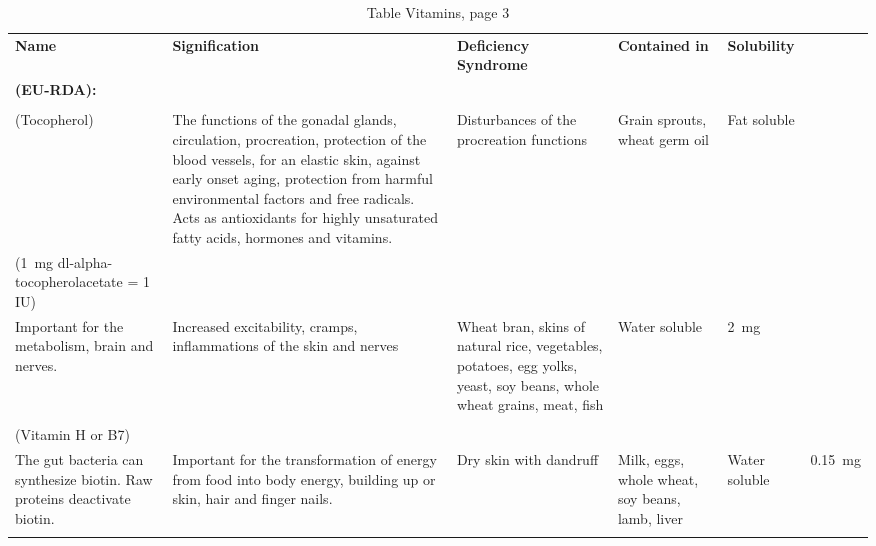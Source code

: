 \documentclass[../main.tex]{subfiles}
\begin{document}
\begin{sidewaystable}[p!]
  \caption{Table Vitamins, page 3}
  \centering
  \begin{tabularx}{\textwidth}{p{3cm}p{4cm}p{5.5cm}p{2.5cm}p{1.5cm}p{2.7cm}}
    \toprule
    \textbf{Name} & \textbf{Signification} & \textbf{Deficiency Syndrome} & \textbf{Contained in} & \textbf{Solubility} & \makecell[{p{1.5cm}}t]{\textbf{RDA} \\ \textbf{(EU-RDA):}} \\
    \midrule
    \rowcolor{lightgray}\makecell[{p{3cm}}t]{\textbf{Vitamin E}\index{vitamin!E} \\ (Tocopherol)} &
    The functions of the gonadal glands, circulation, procreation, protection of the blood vessels,
    for an elastic skin, against early onset aging, protection from harmful environmental factors and free radicals.
    Acts as antioxidants for highly unsaturated fatty acids, hormones and vitamins. &
    Disturbances of the procreation functions &
    Grain sprouts, wheat germ oil & Fat soluble &
    \makecell[{p{2.7cm}}t]{\SI{10}{\mg} \\ (\SI{1}{\mg} dl-alpha-tocopherolacetate = 1 IU) \\
        Important for the metabolism, brain and nerves.} &
    Increased excitability, cramps, inflammations of the skin and nerves &
    Wheat bran, skins of natural rice, vegetables, potatoes, egg yolks, yeast, soy beans, whole wheat grains, meat, fish &
    Water soluble &
    \SI{2}{\mg} \\
    \makecell[{p{3cm}}t]{\textbf{Biotin}\index{vitamin!biotin} \\ (Vitamin H or B7)\\ The gut bacteria can synthesize biotin. Raw proteins deactivate biotin.} &
    Important for the transformation of energy from food into body energy, building up or skin, hair and finger nails. &
    Dry skin with dandruff &
    Milk, eggs, whole wheat, soy beans, lamb, liver &
    Water soluble &
    \SI{0.15}{\mg} \\
 \\
    \bottomrule
  \end{tabularx}
  \end{sidewaystable}
\end{document}

